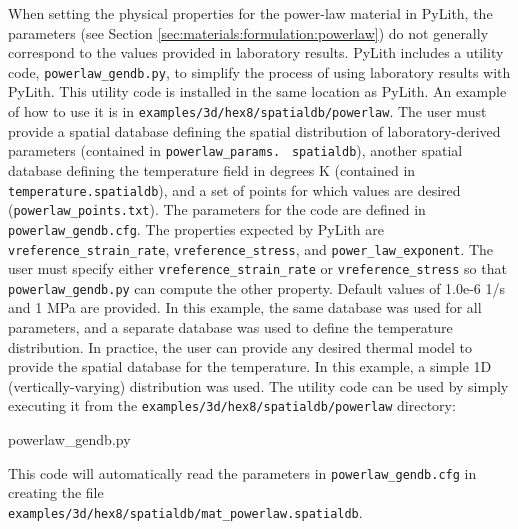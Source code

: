 When setting the physical properties for the power-law material in
PyLith, the parameters (see Section \vref{sec:materials:formulation:powerlaw})
do not generally correspond to the values provided in laboratory results.
PyLith includes a utility code, \texttt{powerlaw\_gendb.py}, to simplify
the process of using laboratory results with PyLith. This utility
code is installed in the same location as PyLith. An example of how
to use it is in \texttt{examples/3d/hex8/spatialdb/powerlaw}. The
user must provide a spatial database defining the spatial distribution
of laboratory-derived parameters (contained in \texttt{powerlaw\_params.}~\linebreak{}
\texttt{spatialdb}), another spatial database defining the temperature
field in degrees K (contained in \texttt{temperature.spatialdb}),
and a set of points for which values are desired (\texttt{powerlaw\_points.txt}).
The parameters for the code are defined in \texttt{powerlaw\_gendb.cfg}.
The properties expected by PyLith are \texttt{vreference\_strain\_rate},
\texttt{vreference\_stress}, and \texttt{power\_law\_exponent}. The
user must specify either \texttt{vreference\_strain\_rate} or \texttt{vreference\_stress}
so that \texttt{powerlaw\_gendb.py} can compute the other property.
Default values of 1.0e-6 1/s and 1 MPa are provided. In this example,
the same database was used for all parameters, and a separate database
was used to define the temperature distribution. In practice, the
user can provide any desired thermal model to provide the spatial
database for the temperature. In this example, a simple 1D (vertically-varying)
distribution was used. The utility code can be used by simply executing
it from the \texttt{examples/3d/hex8/spatialdb/powerlaw} directory:
\begin{lyxcode}
powerlaw\_gendb.py
\end{lyxcode}
This code will automatically read the parameters in \texttt{powerlaw\_gendb.cfg}
in creating the file\\
 \texttt{examples/3d/hex8/spatialdb/mat\_powerlaw.spatialdb}.

